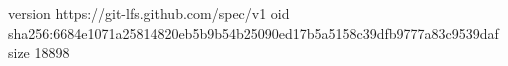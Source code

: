 version https://git-lfs.github.com/spec/v1
oid sha256:6684e1071a25814820eb5b9b54b25090ed17b5a5158c39dfb9777a83c9539daf
size 18898
